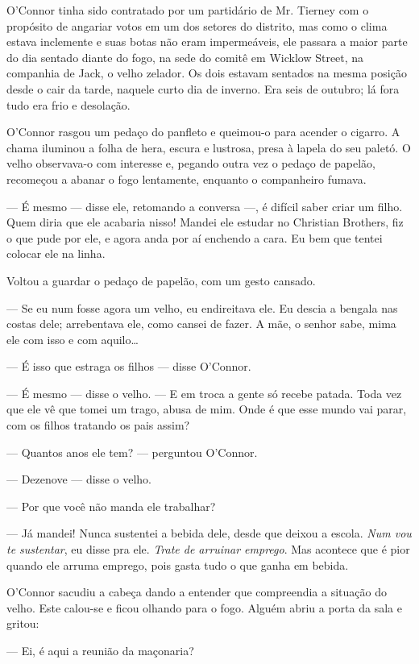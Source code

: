 O'Connor tinha sido contratado por um partidário de Mr. Tierney com o
propósito de angariar votos em um dos setores do distrito, mas como
o clima estava inclemente e suas botas não eram impermeáveis, ele
passara a maior parte do dia sentado diante do fogo, na sede do comitê
em Wicklow Street, na companhia de Jack, o velho zelador. Os dois
estavam sentados na mesma posição desde o cair da tarde, naquele curto
dia de inverno. Era
seis de outubro; lá fora tudo era frio e desolação.

O'Connor rasgou um pedaço do panfleto e queimou-o para acender o
cigarro. A chama iluminou a folha de hera, escura e lustrosa, presa à
lapela do seu paletó. O velho observava-o com interesse e, pegando
outra vez o pedaço de papelão, recomeçou a abanar o fogo lentamente,
enquanto o companheiro fumava.

--- É mesmo --- disse ele, retomando a conversa ---, é difícil saber
criar um filho. Quem diria que ele acabaria nisso! Mandei ele estudar
no Christian Brothers, fiz o que pude por ele, e agora anda por aí
enchendo a cara. Eu bem que tentei colocar ele na linha.

Voltou a guardar o pedaço de papelão, com um gesto cansado.

--- Se eu num fosse agora um velho, eu endireitava ele. Eu descia a
bengala nas costas dele; arrebentava ele, como cansei de fazer. A mãe,
o senhor sabe, mima ele com isso e com aquilo\ldots{}

--- É isso que estraga os filhos --- disse O'Connor.

--- É mesmo --- disse o velho. --- E em troca a gente só recebe
patada. Toda vez que ele vê que tomei um trago, abusa de mim. Onde é
que esse mundo vai parar, com os filhos tratando os pais assim?

--- Quantos anos ele tem? --- perguntou O'Connor.

--- Dezenove --- disse o velho.

--- Por que você não manda ele trabalhar?

--- Já mandei! Nunca sustentei a bebida dele, desde que deixou a
escola. \textit{Num vou te sustentar}, eu disse pra ele. \textit{Trate de arruinar
emprego}. Mas acontece que é pior quando ele arruma emprego, pois gasta
tudo o que ganha em bebida.

O'Connor sacudiu a cabeça dando a entender que compreendia a
situação do velho. Este calou-se e ficou olhando para o fogo. Alguém
abriu a porta da sala e gritou:

--- Ei, é aqui a reunião da maçonaria?

